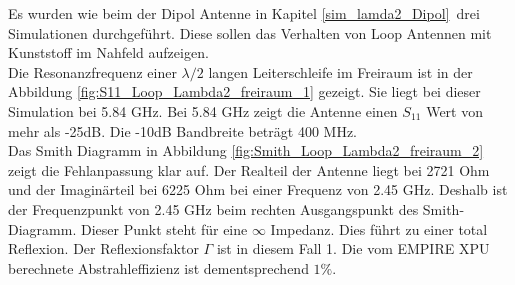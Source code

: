 Es wurden wie beim der Dipol Antenne in Kapitel \ref{sim_lamda2_Dipol}\ drei Simulationen durchgeführt. Diese sollen das Verhalten von Loop Antennen mit Kunststoff im Nahfeld  aufzeigen.\\ 
Die Resonanzfrequenz einer $\lambda/2$ langen Leiterschleife im Freiraum ist in der Abbildung  \ref{fig:S11_Loop_Lambda2_freiraum_1} gezeigt. Sie liegt bei dieser Simulation bei 5.84 GHz.  Bei 5.84 GHz zeigt die Antenne einen $S_{11}$ Wert von mehr als -25dB. Die -10dB Bandbreite beträgt 400 MHz.\\
Das Smith Diagramm in  Abbildung \ref{fig:Smith_Loop_Lambda2_freiraum_2} zeigt die Fehlanpassung klar auf. Der Realteil der Antenne liegt bei 2721 Ohm und der Imaginärteil bei 6225 Ohm bei einer Frequenz von 2.45 GHz. Deshalb ist der Frequenzpunkt von 2.45 GHz beim rechten Ausgangspunkt des Smith-Diagramm. Dieser Punkt steht für eine $\infty$ Impedanz. Dies führt zu einer total Reflexion. Der Reflexionsfaktor $\Gamma$ ist in diesem Fall 1. Die vom EMPIRE XPU berechnete Abstrahleffizienz ist dementsprechend $1\%$.\\


